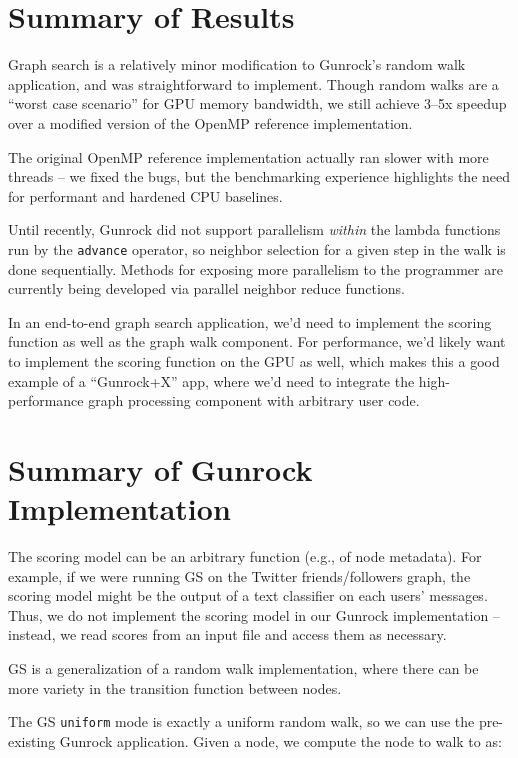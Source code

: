\documentclass[10pt,oneside]{memoir}
\begin{document}
\hypertarget{summary-of-results-3}{%
\section{Summary of Results}\label{summary-of-results-3}}

Graph search is a relatively minor modification to Gunrock's random walk
application, and was straightforward to implement. Though random walks
are a ``worst case scenario'' for GPU memory bandwidth, we still achieve
3--5x speedup over a modified version of the OpenMP reference
implementation.

The original OpenMP reference implementation actually ran slower with
more threads -- we fixed the bugs, but the benchmarking experience
highlights the need for performant and hardened CPU baselines.

Until recently, Gunrock did not support parallelism \emph{within} the
lambda functions run by the \texttt{advance} operator, so neighbor
selection for a given step in the walk is done sequentially. Methods for
exposing more parallelism to the programmer are currently being
developed via parallel neighbor reduce functions.

In an end-to-end graph search application, we'd need to implement the
scoring function as well as the graph walk component. For performance,
we'd likely want to implement the scoring function on the GPU as well,
which makes this a good example of a ``Gunrock+X'' app, where we'd need
to integrate the high-performance graph processing component with
arbitrary user code.

\hypertarget{summary-of-gunrock-implementation-2}{%
\section{Summary of Gunrock
Implementation}\label{summary-of-gunrock-implementation-2}}

The scoring model can be an arbitrary function (e.g., of node metadata).
For example, if we were running GS on the Twitter friends/followers
graph, the scoring model might be the output of a text classifier on
each users' messages. Thus, we do not implement the scoring model in our
Gunrock implementation -- instead, we read scores from an input file and
access them as necessary.

GS is a generalization of a random walk implementation, where there can
be more variety in the transition function between nodes.

The GS \texttt{uniform} mode is exactly a uniform random walk, so we can
use the pre-existing Gunrock application. Given a node, we compute the
node to walk to as:
\end{document}

